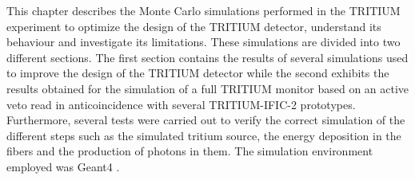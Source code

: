 This chapter describes the Monte Carlo simulations performed in the TRITIUM experiment to optimize the design of the TRITIUM detector, understand its behaviour and investigate its limitations. These simulations are divided into two different sections. The first section contains the results of several simulations used to improve the design of the TRITIUM detector while the second exhibits the results obtained for the simulation of a full TRITIUM monitor based on an active veto read in anticoincidence with several TRITIUM-IFIC-2 prototypes. Furthermore, several tests were carried out to verify the correct simulation of the different steps such as the simulated tritium source, the energy deposition in the fibers and the production of photons in them. The simulation environment employed was Geant4 \cite{Geant4WebPage, Geant4P}.